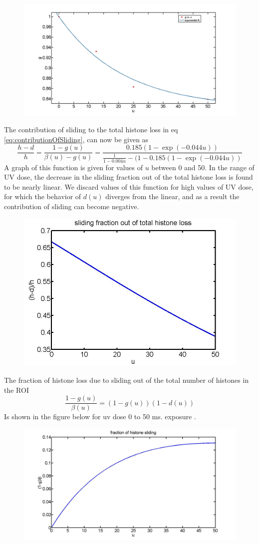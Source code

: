 \documentclass[12pt]{report}
\begin{document}
\begin{figure}[H]
	\centering
\includegraphics[width=0.5\linewidth, height=0.3\textheight]{Images/gVsUVdoseFitExponential}
\caption{}
\label{fig:gVsUVdoseFitExponential}
\end{figure}

The contribution of sliding to the total histone loss in eq \ref{eq:contributionOfSliding}, can now be given as 
\begin{equation}
\frac{h-d}{h} =\frac{1-g(u)}{\beta(u)-g(u)}= \frac{0.185(1-\exp(-0.044u))}{\frac{1}{1-0.004u}-(1-0.185(1-\exp(-0.044u))}
\end{equation}
A graph of this function is given for values of $u$ between 0 and 50. In the range of UV dose, the decrease in the sliding fraction out of the total histone loss is found to be nearly linear. We discard values of this function for high values of UV dose, for which the behavior of $d(u)$ diverges from the linear, and as a result the contribution of sliding can become negative.  

\begin{figure}[H]
\centering
\includegraphics[width=0.5\linewidth, height=0.3\textheight]{Images/slidingFractionOutOfTotal}
\caption{}
\label{fig:slidingFractionOutOfTotal}
\end{figure}

The fraction of histone loss due to sliding out of the total number of histones in the ROI
\begin{equation}
\frac{1-g(u)}{\beta(u)}=(1-g(u))(1-d(u))
\end{equation}
Is shown in the figure below for uv dose 0 to 50 ms. exposure . 
\begin{figure}[H]
\centering
\includegraphics[width=0.7\linewidth, height=0.3\textheight]{Images/fractionOfHistoneSliding}
\caption{}
\label{fig:fractionOfHistoneSliding}
\end{figure}
\end{document}
